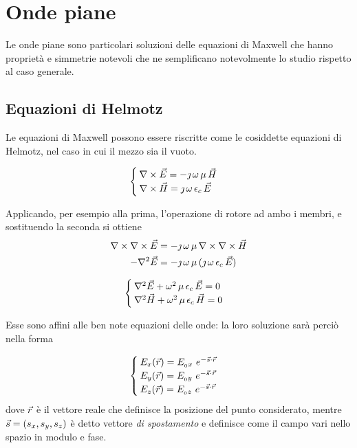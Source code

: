 \chapter{Onde piane}
Le onde piane sono particolari soluzioni delle equazioni di Maxwell che hanno proprietà e simmetrie notevoli che ne semplificano notevolmente lo studio rispetto al caso generale.

\section{Equazioni di Helmotz}
	Le equazioni di Maxwell possono essere riscritte come le cosiddette equazioni di Helmotz, nel caso in cui il mezzo sia il vuoto.

	\begin{equation*}
		\begin{cases}
			\nabla\times\vec{E} = - \jmath \, \omega \, \mu \, \vec{H} \\
			\nabla\times\vec{H} = \jmath \, \omega \, \epsilon_c \, \vec{E} \\
		\end{cases}
	\end{equation*}

	Applicando, per esempio alla prima, l'operazione di rotore ad ambo i membri, e sostituendo la seconda si ottiene
	\begin{equation*}
		\begin{split}
			\nabla\times\nabla\times\vec{E} &= - \jmath \, \omega \, \mu \, \nabla\times \nabla\times\vec{H} \\
			- \nabla^2\vec{E} &= - \jmath \, \omega \, \mu \, (\jmath \, \omega \, \epsilon_c \, \vec{E})\\
		\end{split}
	\end{equation*}

	\begin{equation} \label{eq:helmotz}
		\begin{cases}
			\nabla^2 \vec{E} + \omega^2 \, \mu \, \epsilon_c \, \vec{E} = 0 \\
			\nabla^2 \vec{H} + \omega^2 \, \mu \, \epsilon_c \, \vec{H} = 0
		\end{cases}
	\end{equation}

	Esse sono affini alle ben note equazioni delle onde: la loro soluzione sarà perciò nella forma

	\begin{equation} \label{eq:helmotz_sol}
		\begin{cases}
			E_x(\vec{r}) = E_{_{0}x} ~ e^{-\vec{s} \cdot \vec{r}} \\
			E_y(\vec{r}) = E_{_{0}y} ~ e^{-\vec{s} \cdot \vec{r}} \\
			E_z(\vec{r}) = E_{_{0}z} ~ e^{-\vec{s} \cdot \vec{r}}
		\end{cases}
	\end{equation}
	dove $\vec{r}$ è il vettore reale che definisce la posizione del punto considerato, mentre $\vec{s} = (s_x, s_y, s_z)$ è detto vettore \emph{di spostamento} e definisce come il campo vari nello spazio in modulo e fase.

